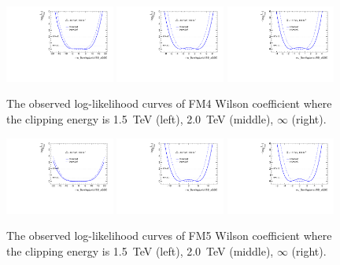 \begin{figure}[ht]
    \centering
    \includegraphics[width=0.32\textwidth]{figures/aQGC/profileFM41500}
    	\includegraphics[width=0.32\textwidth]{figures/aQGC/profileFM42000}
        \includegraphics[width=0.32\textwidth]{figures/aQGC/profileFM4inf}
        \caption{The observed log-likelihood curves of FM4 Wilson coefficient where the clipping energy is 1.5~TeV (left), 2.0~TeV (middle), $\infty$ (right).}
        \label{fig:ProfileLLFM4}
\end{figure}
\begin{figure}[ht]
    \centering
    \includegraphics[width=0.32\textwidth]{figures/aQGC/profileFM51500}
    	\includegraphics[width=0.32\textwidth]{figures/aQGC/profileFM52000}
        \includegraphics[width=0.32\textwidth]{figures/aQGC/profileFM5inf}
        \caption{The observed log-likelihood curves of FM5 Wilson coefficient where the clipping energy is 1.5~TeV (left), 2.0~TeV (middle), $\infty$ (right).}
        \label{fig:ProfileLLFM5}
\end{figure}
